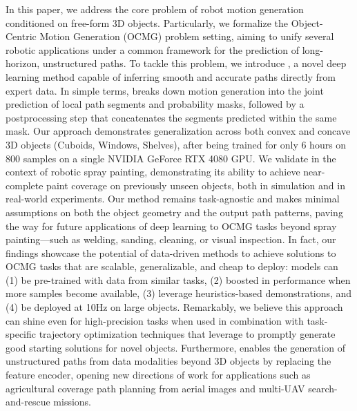 In this paper, we address the core problem of robot motion generation conditioned on free-form 3D objects. Particularly, we formalize the Object-Centric Motion Generation (OCMG) problem setting, aiming to unify several robotic applications under a common framework for the prediction of long-horizon, unstructured paths.
To tackle this problem, we introduce \ours, a novel deep learning method capable of inferring smooth and accurate paths directly from expert data.
%
In simple terms, \ours breaks down motion generation into the joint prediction of local path segments and probability masks, followed by a postprocessing step that concatenates the segments predicted within the same mask.
Our approach demonstrates generalization across both convex and concave 3D objects (Cuboids, Windows, Shelves), after being trained for only 6 hours on 800 samples on a single NVIDIA GeForce RTX 4080 GPU.
We validate \ours in the context of robotic spray painting, demonstrating its ability to achieve near-complete paint coverage on previously unseen objects, both in simulation and in real-world experiments.
Our method remains task-agnostic and makes minimal assumptions on both the object geometry and the output path patterns, paving the way for future applications of deep learning to OCMG tasks beyond spray painting---such as welding, sanding, cleaning, or visual inspection.
In fact, our findings showcase the potential of data-driven methods to achieve solutions to OCMG tasks that are scalable, generalizable, and cheap to deploy: models can (1) be pre-trained with data from similar tasks, (2) boosted in performance when more samples become available, (3) leverage heuristics-based demonstrations, and (4) be deployed at 10Hz on large objects.
Remarkably, we believe this approach can shine even for high-precision tasks when used in combination with task-specific trajectory optimization techniques that leverage \ours to promptly generate good starting solutions for novel objects.
Furthermore, \ours enables the generation of unstructured paths from data modalities beyond 3D objects by replacing the feature encoder, opening new directions of work for applications such as agricultural coverage path planning from aerial images and multi-UAV search-and-rescue missions.

